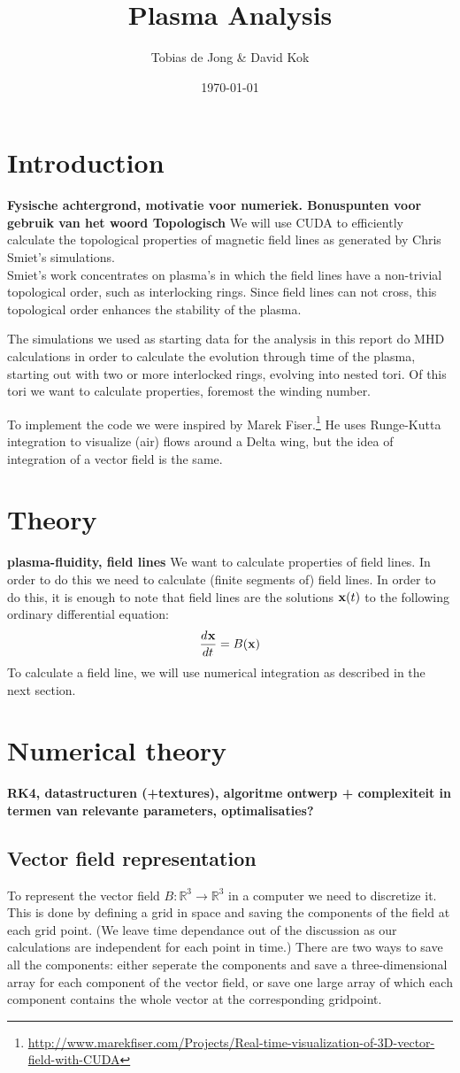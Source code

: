 \documentclass{article}
\newcommand{\Dif}[3][ ]{\ensuremath{\frac{d^{#1} #2}{{d #3}^{#1}}}}
\renewcommand{\vec}{\bold}
\begin{document}
\title{Plasma Analysis}
\author{Tobias de Jong \& David Kok}
\date{\today}
\maketitle
\section{Introduction}
{\bf Fysische achtergrond, motivatie voor numeriek. Bonuspunten voor gebruik van het woord Topologisch }
We will use CUDA to efficiently calculate the topological properties of magnetic field lines as generated by Chris Smiet's simulations.\cite{PhysRevLett.115.095001}\\
Smiet's work concentrates on plasma's in which the field lines have a non-trivial topological order, such as interlocking rings. Since field lines can not cross, this topological order enhances the stability of the plasma.

The simulations we used as starting data for the analysis in this report do MHD calculations in order to calculate the evolution through time of the plasma, starting out with two or more interlocked rings, evolving into nested tori.
Of this tori we want to calculate properties, foremost the winding number.

To implement the code we were inspired by Marek Fiser.\footnote{\url{http://www.marekfiser.com/Projects/Real-time-visualization-of-3D-vector-field-with-CUDA}} He uses Runge-Kutta integration to visualize (air) flows around a Delta wing, but the idea of integration of a vector field is the same.
\section{Theory}
{\bf plasma-fluidity, field lines } We want to calculate properties of field lines. In order to do this we need to calculate (finite segments of) field lines. In  order to do this, it is enough to note that field lines are the solutions $\vec x(t)$ to the following ordinary differential equation:
\[\Dif{\vec x}{t} = B(\vec x)\]
To calculate a field line, we will use numerical integration as described in the next section.
\section{Numerical theory}
{\bf RK4, datastructuren (+textures), algoritme ontwerp + complexiteit in termen van relevante parameters, optimalisaties?}
\subsection{Vector field representation}
To represent the vector field $B: \mathbb{R}^3 \to \mathbb{R}^3$ in a computer we need to discretize it. This is done by defining a grid in space and saving the components of the field at each grid point. (We leave time dependance out of the discussion as our calculations are independent for each point in time.) There are two ways to save all the components: either seperate the components and save a three-dimensional array for each component of the vector field, or save one large array of which each component contains the whole vector at the corresponding gridpoint.
\end{document}
